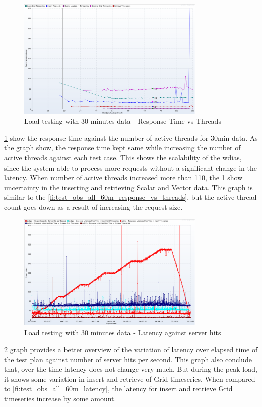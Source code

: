 \begin{figure}[htp]
    \centering
    \includegraphics[width=0.8\textwidth]{results/obs/all/obs_all_30m_response_times_vs_threads.png}
    \caption{Load testing with 30 minutes data - Response Time vs Threads}
    \label{fi:test_obs_all_30m_response_vs_threads}
\end{figure}
\ref{fi:test_obs_all_30m_response_vs_threads} show the response time against the number of active threads for 30min data. As the graph show, the response time kept same while increasing the number of active threads against each test case. This shows the scalability of the \acrshort{wdias}, since the system able to process more requests without a significant change in the latency.
When number of active threads increased more than 110, the \ref{fi:test_obs_all_30m_response_vs_threads} show uncertainty in the inserting and retrieving Scalar and Vector data. This graph is similar to the \ref{fi:test_obs_all_60m_response_vs_threads}, but the active thread count goes down as a result of increasing the request size.

\begin{figure}[htp]
    \centering
    \includegraphics[width=0.8\textwidth]{results/obs/all/obs_all_30m_res_latencies_against_hits.png}
    \caption{Load testing with 30 minutes data - Latency against server hits}
    \label{fi:test_obs_all_30m_latency}
\end{figure}
\ref{fi:test_obs_all_30m_latency} graph provides a better overview of the variation of latency over elapsed time of the test plan against number of server hits per second.
This graph also conclude that, over the time latency does not change very much. But during the peak load, it shows some variation in insert and retrieve of Grid timeseries.
When compared to \ref{fi:test_obs_all_60m_latency}, the latency for insert and retrieve Grid timeseries increase by some amount.


